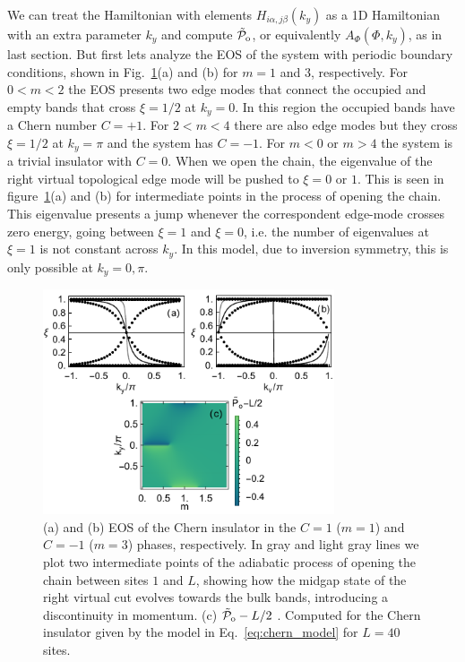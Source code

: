 \documentclass[twocolumn,amsmath,longbibliography,amssymb,superscriptaddress]{revtex4-1}
\newcommand{\tpo}{\tilde{\mathcal{P}}_{\rm o}}
\begin{document}
We can treat the Hamiltonian with elements $H_{i\alpha,j\beta}(k_y)$ as a 1D Hamiltonian with an extra parameter $k_y$ and compute $\tpo$, or equivalently $A_\Phi(\Phi,k_y)$, as in last section. But first lets analyze the EOS of the system with periodic boundary conditions, shown in Fig.~\ref{chern_insulator}(a) and (b) for $m=1$ and $3$, respectively. For $0<m<2$ the EOS presents two edge modes that connect the occupied and empty bands that cross $\xi=1/2$ at $k_y=0$. In this region the occupied bands have a Chern number $C=+1$. For $2<m<4$ there are also edge modes but they cross $\xi=1/2$ at $k_y=\pi$ and the system has $C=-1$. For $m<0$ or $m>4$ the system is a trivial insulator with $C=0$. When we open the chain, the eigenvalue of the right virtual topological edge mode will be pushed to $\xi=0$ or $1$. This is seen in figure~\ref{chern_insulator}(a) and (b) for intermediate points in the process of opening the chain. This eigenvalue presents a jump whenever the correspondent edge-mode crosses zero energy, going between $\xi=1$ and $\xi=0$, i.e. the number of eigenvalues at $\xi = 1$ is not constant across $k_y$. In this model, due to inversion symmetry, this is only possible at $k_y=0,\pi$. 

\begin{figure}[t]
\centering
\includegraphics[width=86mm]{fig7comp.pdf}
\caption{(a) and (b) EOS of the Chern insulator in the $C=1$ ($m=1$) and $C=-1$ ($m=3$) phases, respectively. In gray and light gray lines we plot two intermediate points of the adiabatic process of opening the chain between sites $1$ and $L$, showing how the midgap state of the right virtual cut evolves towards the bulk bands, introducing a discontinuity in momentum. (c) $\tpo-L/2$ . Computed for the Chern insulator given by the model in Eq.~\eqref{eq:chern_model} for $L=40$ sites. }
	\label{chern_insulator}
\end{figure}
\end{document}
